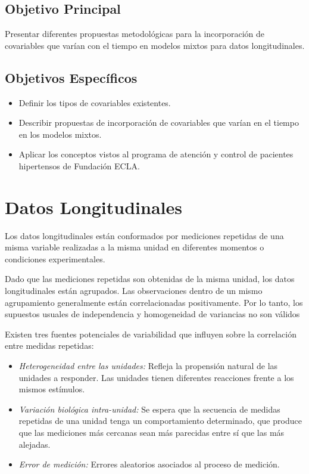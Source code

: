 \documentclass[spanish]{article}
\numberwithin{figure}{subsection}
\numberwithin{equation}{subsection}
\numberwithin{table}{subsection}
\begin{document}
\subsection{Objetivo Principal}

Presentar diferentes propuestas metodológicas para la incorporación de
covariables que varían con el tiempo en modelos mixtos para datos
longitudinales.

\subsection{Objetivos Específicos}

\begin{itemize}
	\item Definir los tipos de covariables existentes.
	\item Describir propuestas de incorporación de covariables que varían en el
	tiempo en los modelos mixtos.
	\item Aplicar los conceptos vistos al programa de
	atención y control de pacientes hipertensos de Fundación ECLA.
\end{itemize}

\newpage
\section{Datos Longitudinales}

Los datos longitudinales están conformados por mediciones repetidas de una misma
variable realizadas a la misma unidad en diferentes momentos o condiciones
experimentales.

Dado que las mediciones repetidas son obtenidas de la misma unidad, los datos
longitudinales están agrupados. Las observaciones dentro de un mismo
agrupamiento generalmente están correlacionadas positivamente. Por lo tanto, los
supuestos usuales de independencia y homogeneidad de variancias no son válidos

Existen tres fuentes potenciales de variabilidad que influyen sobre la
correlación entre medidas repetidas:

\begin{itemize}
	\item \textit{Heterogeneidad entre las unidades:} Refleja la propensión
	natural de las unidades a responder. Las unidades tienen diferentes
	reacciones frente a los mismos estímulos.
	\item \textit{Variación biológica intra-unidad:} Se espera que la secuencia
	de medidas repetidas de una unidad tenga un comportamiento determinado, que
	produce que las mediciones más cercanas sean más parecidas entre sí que las
	más alejadas.
	\item \textit{Error de medición:} Errores aleatorios asociados al proceso de
	medición.
\end{itemize}
\end{document}
